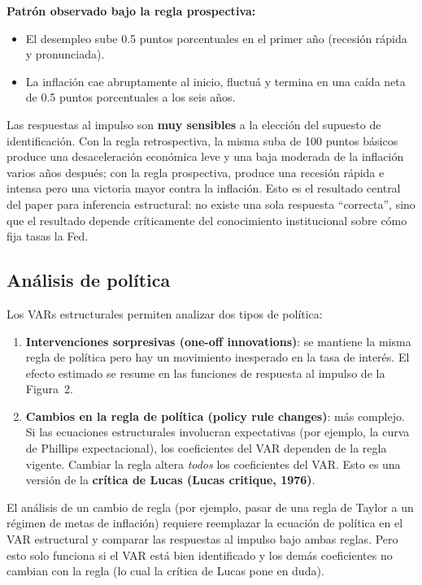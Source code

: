 \documentclass[12pt]{article}
\begin{document}
\textbf{Patr\'on observado bajo la regla prospectiva:}
\begin{itemize}
  \item El desempleo sube 0.5 puntos porcentuales en el primer a\~no (recesi\'on r\'apida y pronunciada).
  \item La inflaci\'on cae abruptamente al inicio, fluctu\'a y termina en una ca\'ida neta de 0.5 puntos porcentuales a los seis a\~nos.
\end{itemize}

\begin{hallazgo}
Las respuestas al impulso son \textbf{muy sensibles} a la elecci\'on del supuesto de identificaci\'on. Con la regla retrospectiva, la misma suba de 100 puntos b\'asicos produce una desaceleraci\'on econ\'omica leve y una baja moderada de la inflaci\'on varios a\~nos despu\'es; con la regla prospectiva, produce una recesi\'on r\'apida e intensa pero una victoria mayor contra la inflaci\'on. Esto es el resultado central del paper para inferencia estructural: no existe una sola respuesta ``correcta'', sino que el resultado depende cr\'iticamente del conocimiento institucional sobre c\'omo fija tasas la Fed.
\end{hallazgo}

\subsection{An\'alisis de pol\'itica}

Los VARs estructurales permiten analizar dos tipos de pol\'itica:

\begin{enumerate}
  \item \textbf{Intervenciones sorpresivas (one-off innovations)}: se mantiene la misma regla de pol\'itica pero hay un movimiento inesperado en la tasa de inter\'es. El efecto estimado se resume en las funciones de respuesta al impulso de la Figura~2.

  \item \textbf{Cambios en la regla de pol\'itica (policy rule changes)}: m\'as complejo. Si las ecuaciones estructurales involucran expectativas (por ejemplo, la curva de Phillips expectacional), los coeficientes del VAR dependen de la regla vigente. Cambiar la regla altera \textit{todos} los coeficientes del VAR. Esto es una versi\'on de la \textbf{cr\'itica de Lucas (Lucas critique, 1976)}.
\end{enumerate}

\begin{intuicion}
El an\'alisis de un cambio de regla (por ejemplo, pasar de una regla de Taylor a un r\'egimen de metas de inflaci\'on) requiere reemplazar la ecuaci\'on de pol\'itica en el VAR estructural y comparar las respuestas al impulso bajo ambas reglas. Pero esto solo funciona si el VAR est\'a bien identificado y los dem\'as coeficientes no cambian con la regla (lo cual la cr\'itica de Lucas pone en duda).
\end{intuicion}
\end{document}
